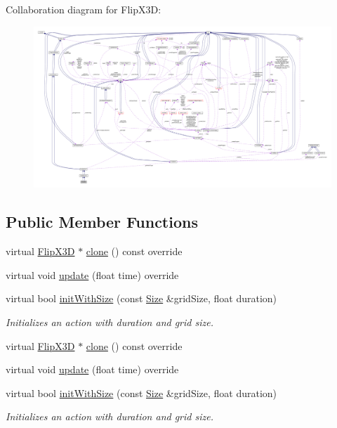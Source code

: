 Collaboration diagram for Flip\+X3D\+:
\nopagebreak
\begin{figure}[H]
\begin{center}
\leavevmode
\includegraphics[width=350pt]{classFlipX3D__coll__graph}
\end{center}
\end{figure}
\subsection*{Public Member Functions}
\begin{DoxyCompactItemize}
\item 
virtual \hyperlink{classFlipX3D}{Flip\+X3D} $\ast$ \hyperlink{classFlipX3D_a3c8f037e07f76fbccb63a960c763a947}{clone} () const override
\item 
virtual void \hyperlink{classFlipX3D_a6f3b43c2a5cf49ed00a373bf54cd97e9}{update} (float time) override
\item 
virtual bool \hyperlink{classFlipX3D_a539e3423b9cf0b06695b10bc463aef3c}{init\+With\+Size} (const \hyperlink{classSize}{Size} \&grid\+Size, float duration)
\begin{DoxyCompactList}\small\item\em Initializes an action with duration and grid size. \end{DoxyCompactList}\item 
virtual \hyperlink{classFlipX3D}{Flip\+X3D} $\ast$ \hyperlink{classFlipX3D_a82c67645ce0cfa6435a7266c00359a94}{clone} () const override
\item 
virtual void \hyperlink{classFlipX3D_adda76f1ed938e8df6761d784e23753e0}{update} (float time) override
\item 
virtual bool \hyperlink{classFlipX3D_a42241dd3304278fdd87ffc4f6d48b942}{init\+With\+Size} (const \hyperlink{classSize}{Size} \&grid\+Size, float duration)
\begin{DoxyCompactList}\small\item\em Initializes an action with duration and grid size. \end{DoxyCompactList}\end{DoxyCompactItemize}
